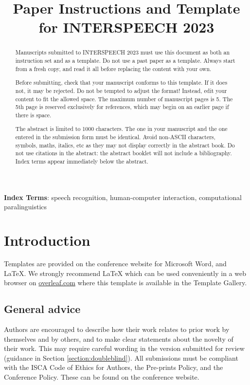 \documentclass{INTERSPEECH2023}
\title{Paper Instructions and Template for INTERSPEECH 2023}
\begin{document}
\maketitle
 
\begin{abstract}
Manuscripts submitted to INTERSPEECH 2023 must use this document as both an instruction set and as a template. Do not use a past paper as a template. Always start from a fresh copy, and read it all before replacing the content with your own.

Before submitting, check that your manuscript conforms to this template. If it does not, it may be rejected. Do not be tempted to adjust the format! Instead, edit your content to fit the allowed space. The maximum number of manuscript pages is 5. The 5th page is reserved exclusively for references, which may begin on an earlier page if there is space.

The abstract is limited to 1000 characters. The one in your manuscript and the one entered in the submission form must be identical. Avoid non-ASCII characters, symbols, maths, italics, etc as they may not display correctly in the abstract book. Do not use citations in the abstract: the abstract booklet will not include a bibliography.  Index terms appear immediately below the abstract. 
\end{abstract}
\noindent\textbf{Index Terms}: speech recognition, human-computer interaction, computational paralinguistics




\section{Introduction}

Templates are provided on the conference website for Microsoft Word\textregistered, and \LaTeX. We strongly recommend \LaTeX\xspace
which can be used conveniently in a web browser on \url{overleaf.com} where this template is available in the Template Gallery.

\subsection{General advice}

Authors are encouraged to describe how their work relates to prior work by themselves and by others, and to make clear statements about the novelty of their work. This may require careful wording in the version submitted for review (guidance in Section \ref{section:doubleblind}). All submissions must be compliant with the ISCA Code of Ethics for Authors, the Pre-prints Policy, and the Conference Policy. These can be found on the conference website.
\end{document}
